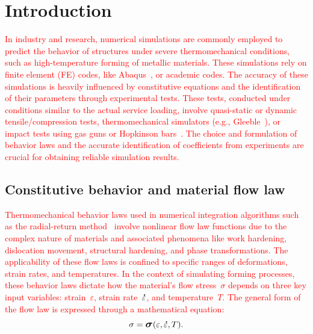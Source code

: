 \documentclass[algorithms,article,submit,pdftex,oneauthors]{Definitions/mdpi}
\DeclareRobustCommand{\mdot}[1]{\accentset{\mbox{\bfseries .}}{#1}}
\DeclareRobustCommand{\Sig}{\mbox{\large\ensuremath{\boldsymbol{\sigma}}}}
\begin{document}
\section{Introduction}\label{sec:Introduction}

\textcolor{red}{In industry and research, numerical simulations are commonly employed to predict the behavior of structures under severe thermomechanical conditions, such as high-temperature forming of metallic materials.
These simulations rely on finite element (FE) codes, like Abaqus~\cite{Abaqus}, or academic codes.
The accuracy of these simulations is heavily influenced by constitutive equations and the identification of their parameters through experimental tests.
These tests, conducted under conditions similar to the actual service loading, involve quasi-static or dynamic tensile/compression tests, thermomechanical simulators (e.g., Gleeble~\cite{Lin-2009-MFS, Bennett-2010-C, Kumar-2016-TMS, Yu-2019-RCR}), or impact tests using gas guns or Hopkinson bars~\cite{Kolsky-1949-IMP}.
The choice and formulation of behavior laws and the accurate identification of coefficients from experiments are crucial for obtaining reliable simulation results.}

\subsection{Constitutive behavior and material flow law}\label{subsec:ConstBehavior}

\textcolor{red}{Thermomechanical behavior laws used in numerical integration algorithms such as the radial-return method~\cite{Ponthot-2002-USU} involve nonlinear flow law functions due to the complex nature of materials and associated phenomena like work hardening, dislocation movement, structural hardening, and phase transformations.
The applicability of these flow laws is confined to specific ranges of deformations, strain rates, and temperatures.
In the context of simulating forming processes, these behavior laws dictate how the material's flow stress~$\sigma$ depends on three key input variables: strain~$\varepsilon$, strain rate~$\mdot{\varepsilon}$, and temperature~$T$.
The general form of the flow law is expressed through a mathematical equation:}
\begin{equation}
\sigma = \Sig\left(\varepsilon, \mdot{\varepsilon}, T\right).\label{eq:GenFlow}
\end{equation}
\end{document}
